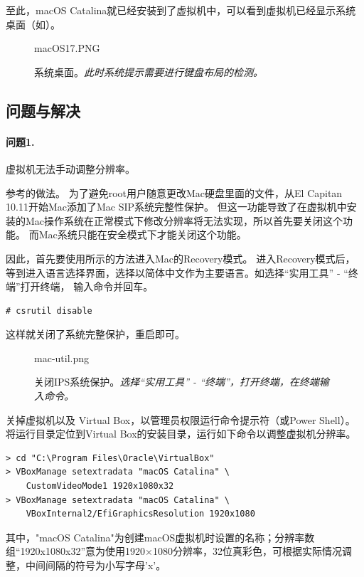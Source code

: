 \documentclass[final]{cvpr}
\newcommand{\mypara}[1]{\paragraph{#1.}}
\begin{document}
至此，macOS Catalina就已经安装到了虚拟机中，可以看到虚拟机已经显示系统桌面（如）。

\begin{figure}
  	\begin{overpic}[width=\columnwidth]{macOS17.PNG}\end{overpic}
    \caption{系统桌面。\textit{此时系统提示需要进行键盘布局的检测。}}\label{fig:macOS17}
\end{figure}


\subsection{\textbf{问题与解决}}
\mypara{问题1}  虚拟机无法手动调整分辨率。

参考\cite{Web/CatalinaRecovery}的做法。
为了避免root用户随意更改Mac硬盘里面的文件，从El Capitan 10.11开始Mac添加了Mac SIP系统完整性保护。
但这一功能导致了在虚拟机中安装的Mac操作系统在正常模式下修改分辨率将无法实现，所以首先要关闭这个功能。
而Mac系统只能在安全模式下才能关闭这个功能。

因此，首先要使用所示的方法进入Mac的Recovery模式。
进入Recovery模式后，等到进入语言选择界面，选择以简体中文作为主要语言。如选择“实用工具” - “终端”打开终端，
输入命令并回车。
\begin{lstlisting}
# csrutil disable
\end{lstlisting}
这样就关闭了系统完整保护，重启即可。
\begin{figure}
  	\begin{overpic}[width=\columnwidth]{mac-util.png}\end{overpic}
    \caption{关闭IPS系统保护。\textit{选择“实用工具” - “终端”，打开终端，在终端输入命令。}}\label{fig:mac-q1}
\end{figure}

关掉虚拟机以及 Virtual Box，以管理员权限运行命令提示符（或Power Shell）。将运行目录定位到Virtual Box的安装目录，运行如下命令以调整虚拟机分辨率。
\begin{lstlisting}
> cd "C:\Program Files\Oracle\VirtualBox"
> VBoxManage setextradata "macOS Catalina" \
    CustomVideoMode1 1920x1080x32
> VBoxManage setextradata "macOS Catalina" \
    VBoxInternal2/EfiGraphicsResolution 1920x1080
\end{lstlisting}
其中，"macOS Catalina"为创建macOS虚拟机时设置的名称；分辨率数组“1920x1080x32”意为使用1920×1080分辨率，32位真彩色，可根据实际情况调整，中间间隔的符号为小写字母'x'。
\end{document}
